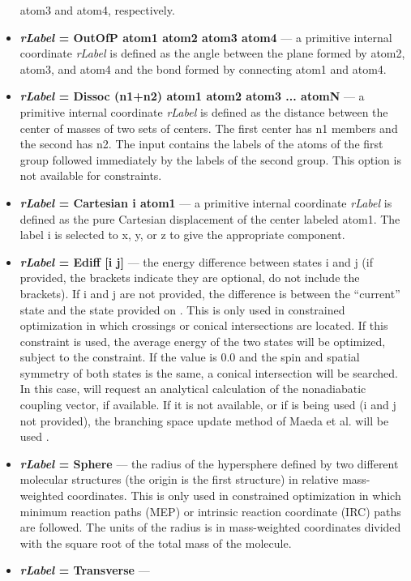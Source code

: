 \begin{itemize}
atom3 and atom4, respectively.
\item
{\bf {\em rLabel} = OutOfP atom1 atom2 atom3 atom4} ---
a primitive internal coordinate {\em rLabel} is defined as the angle
between the plane formed by atom2, atom3, and atom4 and the
bond formed by connecting atom1 and atom4.
\item
{\bf {\em rLabel} = Dissoc (n1+n2) atom1 atom2 atom3 ... atomN} ---
a primitive internal coordinate {\em rLabel} is defined as the distance
between the center of masses of two sets of centers. The first
center has n1 members and the second has n2.
The input contains the labels of the atoms of the first group followed
immediately by the labels of the second group.
This option is not available for constraints.
\item
{\bf {\em rLabel} = Cartesian i atom1} ---
a primitive internal coordinate {\em rLabel} is defined as the pure
Cartesian displacement of the center labeled atom1. The label
i is selected to x, y, or z to give the appropriate component.
\item
{\bf {\em rLabel} = Ediff [i j]      } ---
the energy difference between states i and j (if provided, the brackets indicate they
are optional, do not include the brackets).
If i and j are not provided, the difference is between the ``current'' state and
the state provided on .
This is only used in constrained optimization in which crossings or conical intersections
are located. If this constraint is used, the average energy of the two states will
be optimized, subject to the constraint. If the value is $0.0$ and the spin and spatial
symmetry of both states is the same, a conical intersection will be searched.
In this case,  will request an analytical calculation of the nonadiabatic
coupling vector, if available. If it is not available, or if  is being used
(i and j not provided), the branching space update method of Maeda et al. will be used \cite{Maeda2010}.
\item
{\bf {\em rLabel} = Sphere           } ---
the radius of the hypersphere defined by two different molecular structures
(the origin is the first structure) in relative mass-weighted coordinates.
This is only used in constrained optimization in which minimum reaction paths (MEP) or intrinsic reaction
coordinate (IRC) paths are followed. The units of the radius is in mass-weighted coordinates
divided with the square root of the total mass of the molecule.
\item
{\bf {\em rLabel} = Transverse           } ---

\end{itemize}
